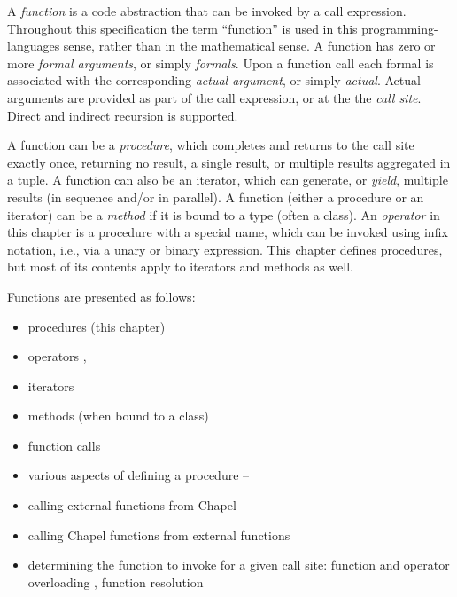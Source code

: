 \label{Functions}

A \emph{function} is a code abstraction that can be invoked by a call
expression. Throughout this specification the term ``function''
is used in this programming-languages sense, rather than
in the mathematical sense.
A function has zero or more \emph{formal arguments}, or simply
\emph{formals}. Upon a function call each formal is associated
with the corresponding \emph{actual argument}, or simply
\emph{actual}. Actual arguments are provided as part of the call
expression, or at the the \emph{call site}.
Direct and indirect recursion is supported.

A function can be a \emph{procedure}, which completes and returns to
the call site exactly once, returning no result, a single result, or
multiple results aggregated in a tuple. A function can also be an
iterator, which can generate, or \emph{yield}, multiple results (in
sequence and/or in parallel). A function (either a procedure or an
iterator) can be a \emph{method} if it is bound to a type (often a
class). An \emph{operator} in this chapter is a procedure
with a special name, which can be invoked using infix notation,
i.e., via a unary or binary expression.
This chapter defines procedures, but most of its contents
apply to iterators and methods as well.

Functions are presented as follows:
\begin{itemize}
\item procedures (this chapter)
\item operators , 
\item iterators 
\item methods (when bound to a class) 
\item function calls 
\item various aspects of defining a procedure
      --
\item calling external functions from Chapel
\item calling Chapel functions from external functions
\item determining the function to invoke for a given call site:
      function and operator overloading ,
      function resolution 
\end{itemize}


